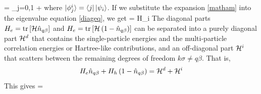 \documentclass[12pt,twoside]{article}
\numberwithin{equation}{section}
\begin{document}
\beq[matpsi]
 = \sum_{j=0,1}  \equiv {} + \eeq
where \(\ket{\phi_j^i} = \bra{j}\ket{\psi_i}\). If we substitute the expansion \ref{matham} into the eigenvalue equation \ref{diageq}, we get
\beq
{} = \tilde H_i
\eeq
The diagonal parts \(H_e = \text{tr}\left[{\mathcal{H} \hat n_{q\beta}}\right]\) and \(H_e = \text{tr}\left[{\mathcal{H} \left({1 - \hat n_{q\beta}}\right)}\right]\) can be separated into a purely diagonal part \(\mathcal{H}^d\) that contains the single-particle energies and the multi-particle correlation energies or Hartree-like contributions, and an off-diagonal part  \(\mathcal{H}^i\) that scatters between the remaining degrees of freedom \(k\sigma \neq q\beta\). That is,
\begin{equation*}
\begin{gathered}
H_e \hat n_{q\beta} + H_h \left({1 - \hat n_{q\beta}}\right) = \mathcal{H}^d + \mathcal{H}^i\\
\end{gathered}
\end{equation*}
This gives
\beq
{} = 
\eeq
\end{document}
